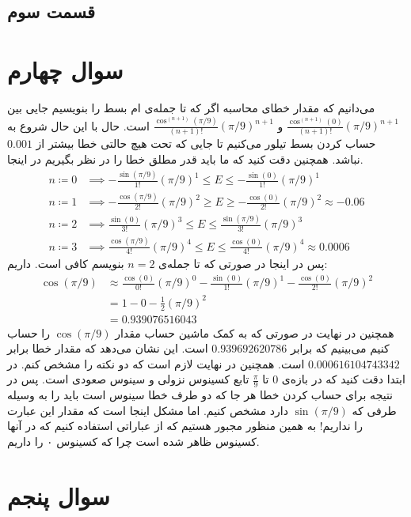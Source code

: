 \documentclass[]{article}
\begin{document}
\subsection*{قسمت سوم}

\section*{سوال چهارم}
می‌دانیم که مقدار خطای محاسبه اگر که تا جمله‌ی
ام
بسط را بنویسیم جایی بین
$\frac{\cos^{(n+1)}(0)}{(n+1)!}(\pi / 9)^{n+1}$ و $\frac{\cos^{(n+1)}(\pi / 9)}{(n+1)!}(\pi / 9)^{n+1}$
است. حال با این حال شروع به حساب کردن بسط تیلور می‌کنیم تا جایی که تحت هیچ حالتی خطا بیشتر از
$0.001$
نباشد. همچنین دقت کنید که ما باید قدر مطلق خطا را در نظر بگیریم در اینجا.
\begin{align*}
    n \coloneqq 0 &\implies -\frac{\sin(\pi / 9)}{1!}(\pi / 9)^{1} \leq E \leq -\frac{\sin(0)}{1!}(\pi / 9)^{1}\\
    n \coloneqq 1 &\implies -\frac{\cos(\pi / 9)}{2!}(\pi / 9)^2 \geq E \geq -\frac{\cos(0)}{2!}(\pi / 9)^{2} \approx -0.06\\
    n \coloneqq 2 &\implies \frac{\sin(0)}{3!}(\pi / 9)^3 \leq E \leq \frac{\sin(\pi / 9)}{3!}(\pi / 9)^{3}\\
    n \coloneqq 3 &\implies \frac{\cos(\pi / 9)}{4!}(\pi / 9)^{4} \leq E \leq \frac{\cos(0)}{4!}(\pi / 9)^4 \approx 0.0006
\end{align*}
پس در اینجا در صورتی که تا جمله‌ی
$n=2$
بنویسم کافی است. داریم:
\begin{align*}
    \cos(\pi/9) &\approx \frac{\cos(0)}{0!}(\pi / 9)^{0} - \frac{\sin(0)}{1!}(\pi / 9)^{1} - \frac{\cos(0)}{2!}(\pi / 9)^{2}\\
    &= 1 - 0 - \frac{1}{2}(\pi / 9)^{2}\\
    &= \boxed{0.939076516043}
\end{align*}
همچنین در نهایت در صورتی که به کمک ماشین حساب مقدار
$\cos(\pi/9)$
را حساب کنیم می‌بینیم که برابر
$0.939692620786$
است. این نشان می‌دهد که مقدار خطا برابر
$0.000616104743342$
است. همچنین در نهایت لازم است که دو نکته را مشخص کنم. در ابتدا دقت کنید که در بازه‌ی
$0$ تا $\frac{\pi}{9}$
تابع کسینوس نزولی و سینوس صعودی است. پس در نتیجه برای حساب کردن
خطا هر جا که دو طرف خطا سینوس است باید
را به وسیله طرفی که
$\sin(\pi / 9)$
دارد مشخص کنیم. اما مشکل اینجا است که مقدار این عبارت را نداریم! به همین منظور مجبور هستیم که
از عباراتی استفاده کنیم که در آنها کسینوس ظاهر شده است چرا که کسینوس ۰ را داریم.
\section*{سوال پنجم}
\end{document}

